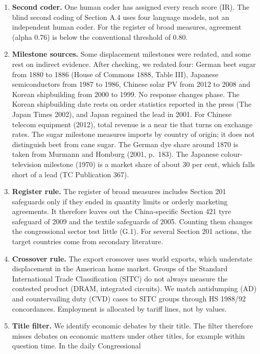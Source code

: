 \begin{enumerate}
\def\labelenumi{\arabic{enumi}.}
\tightlist
\item
  \textbf{Second coder.} One human coder has assigned every reach score
  (IR). The blind second coding of Section A.4 uses four language
  models, not an independent human coder. For the register of broad
  measures, agreement (alpha 0.76) is below the conventional threshold
  of 0.80.
\item
  \textbf{Milestone sources.} Some displacement milestones were redated,
  and some rest on indirect evidence. After checking, we redated four:
  German beet sugar from 1880 to 1886 (House of Commons 1888, Table
  III), Japanese semiconductors from 1987 to 1986, Chinese solar PV from
  2012 to 2008 and Korean shipbuilding from 2000 to 1999. No response
  changes phase. The Korean shipbuilding date rests on order statistics
  reported in the press (The Japan Times 2002), and Japan regained the
  lead in 2001. For Chinese telecom equipment (2012), total revenue is a
  near tie that turns on exchange rates. The sugar milestone measures
  imports by country of origin; it does not distinguish beet from cane
  sugar. The German dye share around 1870 is taken from Murmann and
  Homburg (2001, p.~183). The Japanese colour-television milestone
  (1970) is a market share of about 30 per cent, which falls short of a
  lead (TC Publication 367).
\item
  \textbf{Register rule.} The register of broad measures includes
  Section 201 safeguards only if they ended in quantity limits or
  orderly marketing agreements. It therefore leaves out the
  China-specific Section 421 tyre safeguard of 2009 and the textile
  safeguards of 2005. Counting them changes the congressional sector
  test little (G.1). For several Section 201 actions, the target
  countries come from secondary literature.
\item
  \textbf{Crossover rule.} The export crossover uses world exports,
  which understate displacement in the American home market. Groups of
  the Standard International Trade Classification (SITC) do not always
  measure the contested product (DRAM, integrated circuits). We match
  antidumping (AD) and countervailing duty (CVD) cases to SITC groups
  through HS 1988/92 concordances. Employment is allocated by tariff
  lines, not by values.
\item
  \textbf{Title filter.} We identify economic debates by their title.
  The filter therefore misses debates on economic matters under other
  titles, for example within question time. In the daily Congressional

\end{enumerate}
